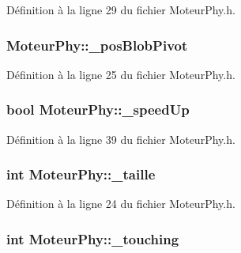 Définition à la ligne 29 du fichier MoteurPhy.h.

\hypertarget{a00013_adea2f52929d858754cc5b47fe9048851}{
\subsubsection[{\_\-posBlobPivot}]{ {\bf MoteurPhy::\_\-posBlobPivot}}}
\label{a00013_adea2f52929d858754cc5b47fe9048851}


Définition à la ligne 25 du fichier MoteurPhy.h.

\hypertarget{a00013_a2d83ff8a47ad2b92fea4514886bc80e2}{
\subsubsection[{\_\-speedUp}]{\setlength{\rightskip}{0pt plus 5cm}bool {\bf MoteurPhy::\_\-speedUp}}}
\label{a00013_a2d83ff8a47ad2b92fea4514886bc80e2}


Définition à la ligne 39 du fichier MoteurPhy.h.

\hypertarget{a00013_a3c1e76cb12396ae57a40340decf3502a}{
\subsubsection[{\_\-taille}]{\setlength{\rightskip}{0pt plus 5cm}int {\bf MoteurPhy::\_\-taille}}}
\label{a00013_a3c1e76cb12396ae57a40340decf3502a}


Définition à la ligne 24 du fichier MoteurPhy.h.

\hypertarget{a00013_a9e294d1d8102ce049a8433f1a1e4f2d8}{
\subsubsection[{\_\-touching}]{\setlength{\rightskip}{0pt plus 5cm}int {\bf MoteurPhy::\_\-touching}}}
\label{a00013_a9e294d1d8102ce049a8433f1a1e4f2d8}



